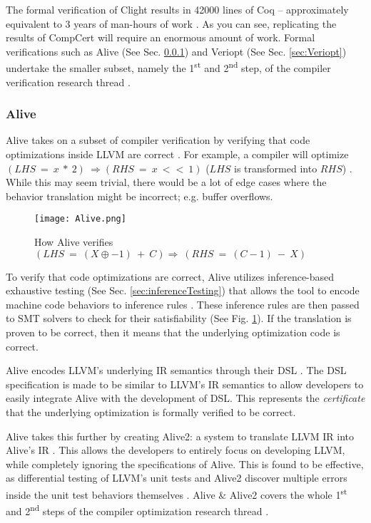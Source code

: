 The formal verification of Clight results in 42000 lines of Coq -- approximately equivalent to 3 years of man-hours 
of work \cite[Sec. 3.3]{compcertVerification}. As you can see, replicating the results of CompCert will require an enormous amount of work.
Formal verifications such as Alive (See Sec. \ref{sec:Alive}) and Veriopt (See Sec. \ref{sec:Veriopt}) undertake the smaller subset, 
namely the 1\textsuperscript{st} and 2\textsuperscript{nd} step, of the compiler verification research thread \cite{CompilerOptimization}.

\subsubsection{Alive}
\label{sec:Alive}

Alive takes on a subset of compiler verification by verifying that code optimizations inside LLVM are correct \cite{AliveInLean}. For example, 
a compiler will optimize \((LHS\ =\ x\ *\ 2)\ \Longrightarrow (RHS\ =\ x\ <<\ 1)\) (\(LHS\) is transformed into \(RHS\)) \cite[Sec. 2.1]{AliveInLean}. 
While this may seem trivial, there would be a lot of edge cases where the behavior translation might be incorrect; e.g. buffer overflows.

\begin{figure}[ht]
    \centering
    \texttt{[image: Alive.png]}
    \caption{How Alive verifies \((LHS\ =\ (X \oplus -1)\ +\ C) \Longrightarrow \ (RHS\ =\ (C-1)\ -\ X)\) \cite[pp. 1]{AliveInLean}}
    \label{fig:AliveSystem}
\end{figure}

To verify that code optimizations are correct, Alive utilizes inference-based exhaustive testing (See Sec. \ref{sec:inferenceTesting}) that allows 
the tool to encode machine code behaviors to inference rules \cite[Sec. 3.1.1]{AliveInLean}. These inference rules are then passed to SMT solvers 
to check for their satisfiability (See Fig. \ref{fig:AliveSystem}). If the translation is proven to be correct, then it means that the underlying 
optimization code is correct.

Alive encodes LLVM's \cite{llvm} underlying IR semantics through their DSL \cite[Fig. 1]{AliveInLean}. The DSL specification is made to be 
similar to LLVM's IR semantics to allow developers to easily integrate Alive with the development of DSL. This represents the 
\emph{certificate} that the underlying optimization is formally verified to be correct.

Alive takes this further by creating Alive2: a system to translate LLVM IR into Alive's IR \cite{Alive2}. This allows the developers to entirely 
focus on developing LLVM, while completely ignoring the specifications of Alive. This is found to be effective, as differential testing of 
LLVM's unit tests and Alive2 discover multiple errors inside the unit test behaviors themselves \cite[Sec. 8.2]{Alive2}. Alive \& Alive2 covers 
the whole 1\textsuperscript{st} and 2\textsuperscript{nd} steps of the compiler optimization research thread \cite[pp. 5]{CompilerOptimization}.

